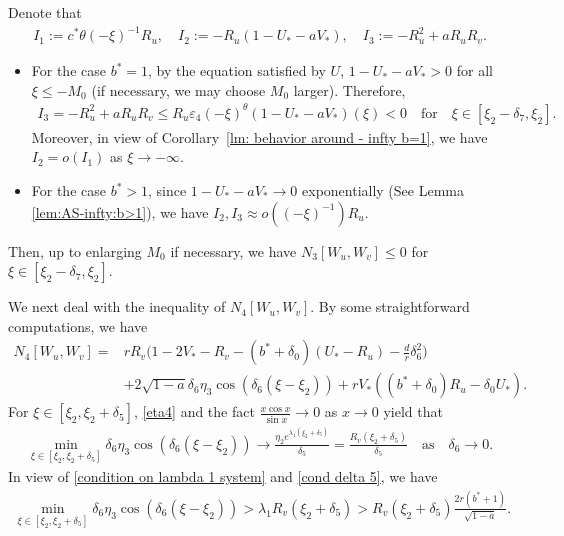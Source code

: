 \documentclass[11pt,a4paper]{article}
\numberwithin{equation}{section}
\numberwithin{figure}{section}
\newcommand\bea{\begin{eqnarray}}
\newcommand\eea{\end{eqnarray}}
\newcommand\beaa{\begin{eqnarray*}}
\newcommand\eeaa{\end{eqnarray*}}
\begin{document}
Denote that
\beaa
I_1:=c^*\theta(-\xi)^{-1}R_u,\quad
I_2:=-R_u(1-U_*-aV_*),\quad
I_3:=-R_u^2+aR_uR_v.
\eeaa
\begin{itemize}
\item For the case $b^*=1$, by the equation satisfied by $U$,  $1-U_*-aV_*>0$ for all $\xi\leq -M_0$ (if necessary, we may choose $M_0$ larger). Therefore,
\beaa
I_3=-R_u^2+aR_uR_v\leq R_u\varepsilon_4(-\xi)^{\theta}(1-U_*-aV_*)(\xi)<0\quad \mbox{for}\quad \xi\in[\xi_2-\delta_7,\xi_2].
\eeaa
Moreover, in view of Corollary~\ref{lm: behavior around - infty b=1}, we have
$I_2=o(I_1)$ as $\xi\to-\infty$.
\item For the case $b^*>1$, since $1-U_*-aV_*\to 0$ exponentially (See Lemma \ref{lem:AS-infty:b>1}), we have $I_2,I_3\approx o((-\xi)^{-1})R_u$.
\end{itemize}
Then, up to enlarging $M_0$ if necessary, we have $N_3[W_u,W_v]\le 0$ for $\xi\in[\xi_2-\delta_7,\xi_2]$.

We next deal with the inequality of $N_4[W_u,W_v]$.
By some straightforward computations, we have
\begin{equation}\label{N4 inequality step 5}
\begin{aligned}
N_4[W_u,W_v]=& rR_v\Big(1-2V_*-R_v-(b^*+\delta_0)(U_*-R_u)
-\frac{d}{r}\delta_6^2\Big)\\&+2\sqrt{1-a}\delta_6\eta_3\cos(\delta_6(\xi-\xi_2))+rV_*((b^*+\delta_0)R_u-\delta_0U_*).
\end{aligned}
\end{equation}
For $\xi\in[\xi_2,\xi_2+\delta_5]$, \eqref{eta4} and the fact $\frac{x\cos x}{\sin x}\to 0$ as $x\to 0$ yield that
\beaa
\min_{\xi\in[\xi_2,\xi_2+\delta_5]}\delta_6\eta_3\cos(\delta_6(\xi-\xi_2))\to\frac{\eta_2e^{\lambda_1(\xi_2+\delta_5)}}{\delta_5}
=\frac{R_v(\xi_2+\delta_5)}{\delta_5}
\quad\text{as}\quad \delta_6\to0.
\eeaa
In view of \eqref{condition on lambda 1 system} and \eqref{cond delta 5},
we have
\bea\label{Rv-estimate2}
\min_{\xi\in[\xi_2,\xi_2+\delta_5]}\delta_6\eta_3\cos(\delta_6(\xi-\xi_2))>\lambda_1R_v(\xi_2+\delta_5)>R_v(\xi_2+\delta_5)\frac{2r(b^*+1)}{\sqrt{1-a}}.
\eea
\end{document}

